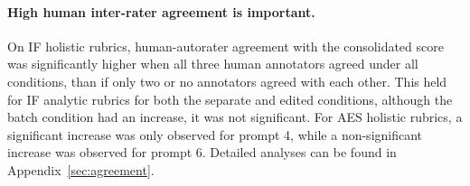\paragraph{High human inter-rater agreement is important.} On IF holistic rubrics, human-autorater agreement with the consolidated score was significantly higher when all three human annotators agreed under all conditions, than if only two or no annotators agreed with each other. This held for IF analytic rubrics for both the separate and edited conditions, although the batch condition had an increase, it was not significant. For AES holistic rubrics, a significant increase was only observed for prompt 4, while a non-significant increase was observed for prompt 6. Detailed analyses can be found in Appendix~\ref{sec:agreement}.



